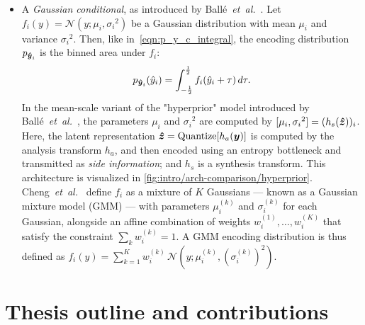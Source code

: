 \begin{itemize}
  \item
    A \emph{Gaussian conditional}, as introduced by Ballé~\emph{et~al.}~\cite{balle2018variational}.
    Let $f_i(y) = \mathcal{N}(y; {\mu_i}, {\sigma_i}^2)$ be a Gaussian distribution with mean ${\mu_i}$ and variance ${\sigma_i}^2$.
    Then, like in~\cref{eqn:p_y_c_integral}, the encoding distribution $p_{{\boldsymbol{\hat{y}}}_i}$ is the binned area under $f_i$:
    \begin{equation}
      \label{eqn:p_y_i_integral}
      p_{{\boldsymbol{\hat{y}}}_i}(\hat{y}_i)
      = \int_{-\frac{1}{2}}^{\frac{1}{2}} f_i(\hat{y}_i + \tau) \, d\tau.
    \end{equation}
    In the mean-scale variant of the "hyperprior" model introduced by Ballé~\emph{et~al.}~\cite{balle2018variational},
    the parameters ${\mu_i}$ and ${\sigma_i}^2$ are computed by
    $[{\mu_i}, {\sigma_i}^2] = (h_s({\boldsymbol{\hat{z}}}))_i$.
    Here, the latent representation ${\boldsymbol{\hat{z}}} = \operatorname{Quantize}[h_a({\boldsymbol{y}})]$ is computed by the analysis transform $h_a$, and then encoded using an entropy bottleneck and transmitted as \emph{side information};
    and $h_s$ is a synthesis transform.
    This architecture is visualized in \cref{fig:intro/arch-comparison/hyperprior}.
    Cheng~\emph{et~al.}~\cite{cheng2020learned} define $f_i$ as a mixture of $K$ Gaussians --- known as a Gaussian mixture model (GMM) --- with parameters ${\mu}_{i}^{(k)}$ and ${\sigma}_{i}^{(k)}$ for each Gaussian, alongside an affine combination of weights ${w}_{i}^{(1)}, \ldots, {w}_{i}^{(K)}$ that satisfy the constraint $\sum_k {w}_{i}^{(k)} = 1$.
    A GMM encoding distribution is thus defined as
    $f_i(y) = \sum_{k=1}^{K} {w}_{i}^{(k)} \, \mathcal{N}(y; {\mu}_{i}^{(k)}, ({\sigma}_{i}^{(k)})^2)$.
\end{itemize}




\section{Thesis outline and contributions}

